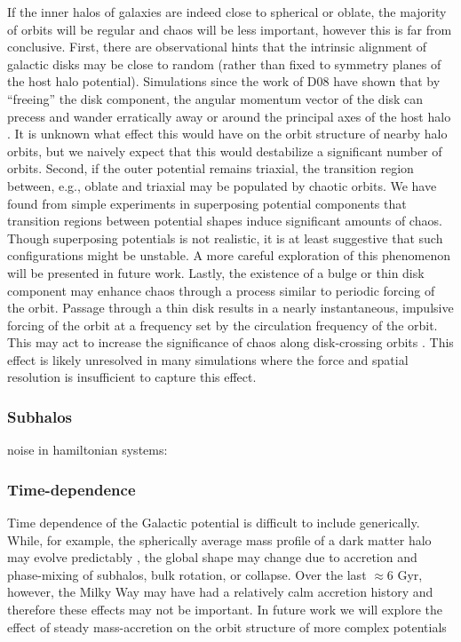 \documentclass[letterpaper,12pt,preprint]{aastex}
\begin{document}
If the inner halos of galaxies are indeed close to spherical or oblate, the majority of orbits will be regular and chaos will be less important, however this is far from conclusive. First, there are observational hints that the intrinsic alignment of galactic disks may be close to random \citep{??} (rather than fixed to symmetry planes of the host halo potential). Simulations since the work of D08 have shown that by ``freeing'' the disk component, the angular momentum vector of the disk can precess and wander erratically away or around the principal axes of the host halo \citep{debattista15}. It is unknown what effect this would have on the orbit structure of nearby halo orbits, but we naively expect that this would destabilize a significant number of orbits. Second, if the outer potential remains triaxial, the transition region between, e.g., oblate and triaxial may be populated by chaotic orbits. We have found from simple experiments in superposing potential components that transition regions between potential shapes induce significant amounts of chaos. Though superposing potentials is not realistic, it is at least suggestive that such configurations might be unstable. A more careful exploration of this phenomenon will be presented in future work. Lastly, the existence of a bulge or thin disk component may enhance chaos through a process similar to periodic forcing of the orbit. Passage through a thin disk results in a nearly instantaneous, impulsive forcing of the orbit at a frequency set by the circulation frequency of the orbit. This may act to increase the significance of chaos along disk-crossing orbits \citep[e.g.,][]{kandrup00}. This effect is likely unresolved in many simulations where the force and spatial resolution is insufficient to capture this effect.

\subsubsection{Subhalos}

noise in hamiltonian systems: \citep{kandrup00}

\subsubsection{Time-dependence}

Time dependence of the Galactic potential is difficult to include generically. While, for example, the spherically average mass profile of a dark matter halo may evolve predictably \citep[in cosmological simulations;][]{wechsler02, buist14}, the global shape may change due to accretion and phase-mixing of subhalos, bulk rotation, or collapse. Over the last $\approx$6 Gyr, however, the Milky Way may have had a relatively calm accretion history and therefore these effects may not be important. In future work we will explore the effect of steady mass-accretion on the orbit structure of more complex potentials
\end{document}
